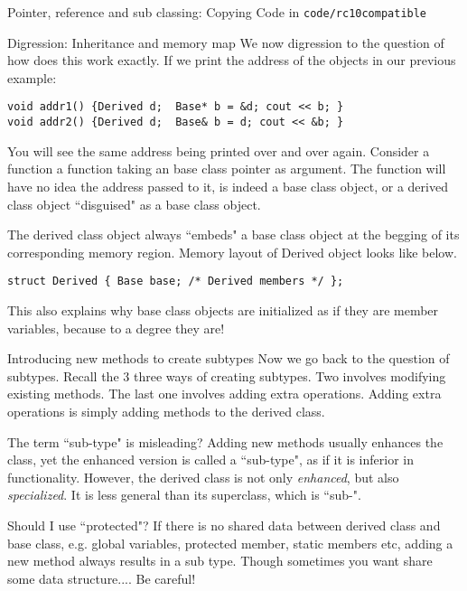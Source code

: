 \begin{frame}[fragile]{Pointer, reference and sub classing: Copying}
Code in \texttt{code/rc10compatible}
\end{frame}

\begin{frame}[fragile]{Digression: Inheritance and memory map}
We now digression to the question of how does this work exactly. If we print the address of the objects in our previous example:
\begin{verbatim}
void addr1() {Derived d;  Base* b = &d; cout << b; }
void addr2() {Derived d;  Base& b = d; cout << &b; }
\end{verbatim}
You will see the same address being printed over and over again. Consider a function a function taking an base class pointer as argument. The function will have no idea the address passed to it, is indeed a base class object, or a derived class object ``disguised" as a base class object. 

The derived class object always ``embeds" a base class object at the begging of its corresponding memory region. Memory layout of Derived object looks like below.  
\begin{verbatim}
struct Derived { Base base; /* Derived members */ };
\end{verbatim}
This also explains why base class objects are initialized as if they are member variables, because to a degree they are!
\end{frame}

\begin{frame}{Introducing new methods to create subtypes}
Now we go back to the question of subtypes. Recall the 3 three ways of creating subtypes. Two  involves modifying existing methods. The last one involves adding extra operations. Adding extra operations is simply adding methods to the derived class.  

\begin{block}{The term ``sub-type" is misleading?}
Adding new methods usually enhances the class, yet the enhanced version is called a ``sub-type", as if it is inferior in functionality. However, the derived class is not only \textit{enhanced}, but also \textit{specialized}. It is less general than its superclass, which is ``sub-".
\end{block}

\begin{block}{Should I use ``protected"?}
If there is no shared data between derived class and base class, e.g. global variables, protected member, static members etc, adding a new method always results in a sub type. Though sometimes you want share some data structure.... Be careful!
\end{block}
\end{frame}

